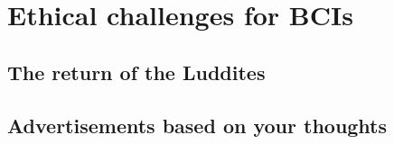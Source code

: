 
\lipsum[1-3]



\section{Ethical challenges for BCIs}
\label{sec:bci_ethical}

\lipsum[1-2]


\subsection{The return of the Luddites}
\label{subsec:bci_ethical_luddites}

\lipsum[1]


\subsection{Advertisements based on your thoughts}
\label{subsec:bci_ethical_data_mining}

\lipsum[1]

